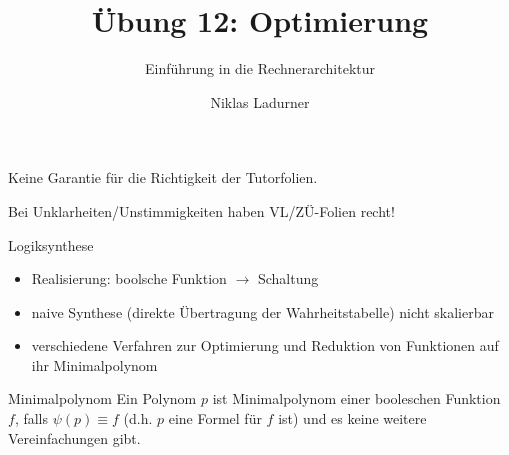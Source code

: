 \documentclass[
  german,            %
  aspectratio=169,    %
]{tumbeamer}
\title{Übung 12: Optimierung}
\subtitle{Einführung in die Rechnerarchitektur}
\author{Niklas Ladurner}
\institute{\theChairName\\\theDepartmentName\\\theUniversityName}
\date{\DTMdisplaydate{2025}{01}{17}{-1}}
\begin{document}
\maketitle

\begin{frame}[c, fragile]{}{}
	\begin{center}
		\LARGE  Keine Garantie für die Richtigkeit der Tutorfolien.

		\Large Bei Unklarheiten/Unstimmigkeiten haben VL/ZÜ-Folien recht!
	\end{center}
\end{frame}

\begin{frame}[fragile, c]{Logiksynthese}{}
	\begin{itemize}
		\item Realisierung: boolsche Funktion $\rightarrow$ Schaltung
		\item naive Synthese (direkte Übertragung der Wahrheitstabelle) nicht skalierbar
		\item verschiedene Verfahren zur Optimierung und Reduktion von Funktionen auf ihr Minimalpolynom
	\end{itemize}
	\begin{block}{Minimalpolynom}
		Ein Polynom $p$ ist Minimalpolynom einer booleschen Funktion $f$, falls  $\psi(p) \equiv f$ (d.h. $p$ eine Formel für $f$ ist) und es keine weitere Vereinfachungen gibt.
	\end{block}
\end{frame}
\end{document}
